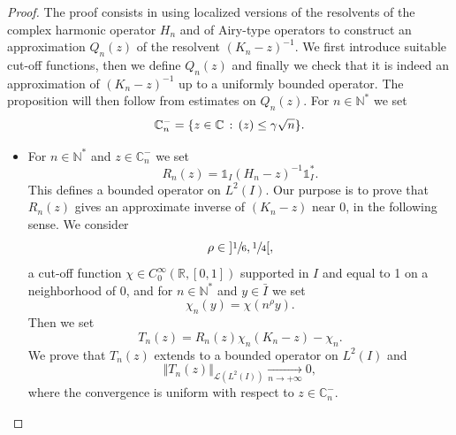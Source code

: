 \documentclass[10pt]{amsart}
\let\mathcal\mathscr
\theoremstyle{plain}
\theoremstyle{definition}
\newcommand {\limt}[2]{\xrightarrow[#1 \to #2]{}}
\newcommand{\nr}[1]{\Vert #1\Vert}
\newcommand{\set}[1]{\{ #1\}}
\newcommand{\inv}{^{-1}}
\newcommand{\1}{\mathds 1}
\newcommand{\st}{\,:\,}
\let\Re\relax
\DeclareMathOperator{\Re}{\mathsf{Re}\mkern2mu}
\newcommand{\R}{\mathbb{R}}
\def\C{\mathbb{C}}
\newcommand{\N}{\mathbb{N}}
\let\g\gamma
\let\h\chi
\newcommand{\Lc}{{\mathcal L}}
\begin{document}
\begin{proof}
The proof consists in using localized versions of the resolvents of the complex harmonic operator $H_n$ and of Airy-type operators to construct an approximation $Q_n(z)$ of the resolvent $(K_n-z)\inv$. We first introduce suitable cut-off functions, then we define $Q_n(z)$ and finally we check that it is indeed an approximation
of $(K_n -z)^{-1}$ up to a uniformly bounded operator. The proposition will then follow from estimates on $Q_n(z)$.
For $n \in \N^*$ we set
\[
\C_n^- = \set{z \in \C \st \Re(z) \leq \g \sqrt n}.
\]

\begin{itemize}
\item
For $n \in \N^*$ and $z \in \C_n^-$ we set
\[
R_n(z) = \1_I (H_n-z)\inv \1_I^*.
\]
This defines a bounded operator on $L^2(I)$. Our purpose is to prove that $R_n(z)$ gives an approximate inverse of $(K_n-z)$ near 0, in the following sense. We consider
\[
\rho \in{}]\sfrac 16,\sfrac 14[,
\]
a cut-off function $\h \in C_0^\infty(\R,[0,1])$ supported in $I$ and equal to 1 on a neighborhood of 0, and for $n \in \N^*$ and $y \in \bar I$ we set
\[
\h_n(y) = \h(n^\rho y).
\]
Then we set
\[
T_n(z) = R_n(z) \chi_n (K_n-z) - \chi_n.
\]
We prove that $T_n(z)$ extends to a bounded operator on $L^2(I)$ and
\begin{equation} \label{estim-res-Rn}
\nr{T_n(z)}_{\Lc(L^2(I))} \limt n {+\infty} 0,
\end{equation}
where the convergence is uniform with respect to $z \in \C_n^-$.


\end{itemize}
\end{proof}
\end{document}

